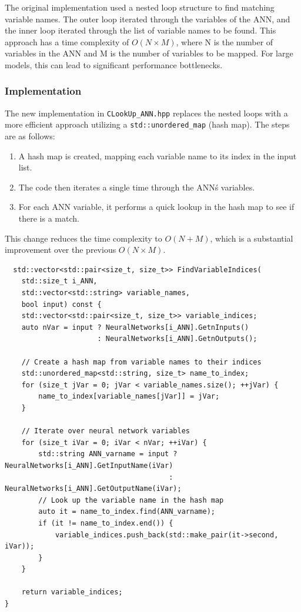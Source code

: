 \documentclass{article}
\begin{document}
The original implementation used a nested loop structure to find matching variable names. The outer loop iterated through the variables of the ANN, and the inner loop iterated through the list of variable names to be found. This approach has a time complexity of $O(N \times M)$, where N is the number of variables in the ANN and M is the number of variables to be mapped. For large models, this can lead to significant performance bottlenecks.

\subsubsection{Implementation}
The new implementation in \texttt{CLookUp\_ANN.hpp} replaces the nested loops with a more efficient approach utilizing a \texttt{std::unordered\_map} (hash map). The steps are as follows:

\begin{enumerate}
    \item A hash map is created, mapping each variable name to its index in the input list.
    \item The code then iterates a single time through the ANN\'s variables.
    \item For each ANN variable, it performs a quick lookup in the hash map to see if there is a match.
\end{enumerate}

This change reduces the time complexity to $O(N+M)$, which is a substantial improvement over the previous $O(N \times M)$.

\begin{verbatim}
  std::vector<std::pair<size_t, size_t>> FindVariableIndices(
    std::size_t i_ANN,
    std::vector<std::string> variable_names,
    bool input) const {
    std::vector<std::pair<size_t, size_t>> variable_indices;
    auto nVar = input ? NeuralNetworks[i_ANN].GetnInputs()
                      : NeuralNetworks[i_ANN].GetnOutputs();

    // Create a hash map from variable names to their indices
    std::unordered_map<std::string, size_t> name_to_index;
    for (size_t jVar = 0; jVar < variable_names.size(); ++jVar) {
        name_to_index[variable_names[jVar]] = jVar;
    }

    // Iterate over neural network variables
    for (size_t iVar = 0; iVar < nVar; ++iVar) {
        std::string ANN_varname = input ? NeuralNetworks[i_ANN].GetInputName(iVar)
                                       : NeuralNetworks[i_ANN].GetOutputName(iVar);
        // Look up the variable name in the hash map
        auto it = name_to_index.find(ANN_varname);
        if (it != name_to_index.end()) {
            variable_indices.push_back(std::make_pair(it->second, iVar));
        }
    }

    return variable_indices;
}
\end{verbatim}
\end{document}
